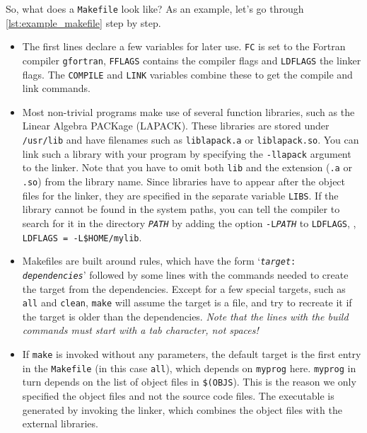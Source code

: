 
So, what does a \texttt{Makefile} look like? As an example, let's go through \autoref{lst:example_makefile} step by step.
\begin{itemize}
  \item The first lines declare a few variables for later use.
    \texttt{FC} is set to the Fortran compiler \texttt{gfortran}, \texttt{FFLAGS} contains the compiler flags and \texttt{LDFLAGS} the linker flags.
    The \texttt{COMPILE} and \texttt{LINK} variables combine these to get the compile and link commands.
  \item Most non-trivial programs make use of several function libraries, such as the Linear Algebra PACKage (LAPACK).
    These libraries are stored under \texttt{/usr/lib} and have filenames such as \texttt{liblapack.a} or \texttt{liblapack.so}.
    You can link such a library with your program by specifying the \texttt{-llapack} argument to the linker.
    Note that you have to omit both \texttt{lib} and the extension (\texttt{.a} or \texttt{.so}) from the library name.
    Since libraries have to appear after the object files for the linker, they are specified in the separate variable \texttt{LIBS}.
    If the library cannot be found in the system paths, you can tell the compiler to search for it in the directory \texttt{\emph{PATH}} by adding the option \texttt{-L\emph{PATH}} to \texttt{LDFLAGS}, \eg, \texttt{LDFLAGS = -L\$HOME/mylib}.
  \item Makefiles are built around rules, which have the form `\texttt{\emph{target}: \emph{dependencies}}' followed by some lines with the commands needed to create the target from the dependencies.
    Except for a few special targets, such as \texttt{all} and \texttt{clean}, \texttt{make} will assume the target is a file, and try to recreate it if the target is older than the dependencies.
    \emph{Note that the lines with the build commands must start with a tab character, not spaces!}
  \item If \texttt{make} is invoked without any parameters, the default target is the first entry in the \texttt{Makefile} (in this case \texttt{all}), which depends on \texttt{myprog} here.
    \texttt{myprog} in turn depends on the list of object files in \texttt{\$(OBJS}).
    This is the reason we only specified the object files and not the source code files.
    The executable is generated by invoking the linker, which combines the object files with the external libraries.

\end{itemize}
